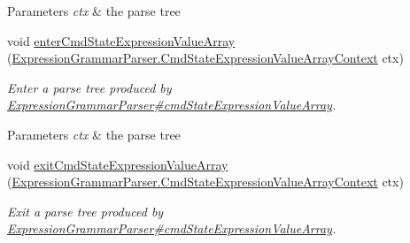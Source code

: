 \begin{DoxyCompactItemize}
\begin{DoxyCompactList}
\begin{DoxyParams}{Parameters}
{\em ctx} & the parse tree\\
\hline
\end{DoxyParams}
 \end{DoxyCompactList}\item 
void \hyperlink{classgov_1_1nasa_1_1jpf_1_1inspector_1_1server_1_1expression_1_1parser_1_1_expression_grammar_base_listener_a5a037779c228fa255993bf10a0fd145f}{enter\+Cmd\+State\+Expression\+Value\+Array} (\hyperlink{classgov_1_1nasa_1_1jpf_1_1inspector_1_1server_1_1expression_1_1parser_1_1_expression_grammar_pa4110664045d2bee8d9164488bf2614d4}{Expression\+Grammar\+Parser.\+Cmd\+State\+Expression\+Value\+Array\+Context} ctx)
\begin{DoxyCompactList}\small\item\em Enter a parse tree produced by \hyperlink{classgov_1_1nasa_1_1jpf_1_1inspector_1_1server_1_1expression_1_1parser_1_1_expression_grammar_parser_a5ca6781f2d54419c03ff89334158c305}{Expression\+Grammar\+Parser\#cmd\+State\+Expression\+Value\+Array}.


\begin{DoxyParams}{Parameters}
{\em ctx} & the parse tree\\
\hline
\end{DoxyParams}
 \end{DoxyCompactList}\item 
void \hyperlink{classgov_1_1nasa_1_1jpf_1_1inspector_1_1server_1_1expression_1_1parser_1_1_expression_grammar_base_listener_a63652a8e9d872b5eba6b72624b596ff7}{exit\+Cmd\+State\+Expression\+Value\+Array} (\hyperlink{classgov_1_1nasa_1_1jpf_1_1inspector_1_1server_1_1expression_1_1parser_1_1_expression_grammar_pa4110664045d2bee8d9164488bf2614d4}{Expression\+Grammar\+Parser.\+Cmd\+State\+Expression\+Value\+Array\+Context} ctx)
\begin{DoxyCompactList}\small\item\em Exit a parse tree produced by \hyperlink{classgov_1_1nasa_1_1jpf_1_1inspector_1_1server_1_1expression_1_1parser_1_1_expression_grammar_parser_a5ca6781f2d54419c03ff89334158c305}{Expression\+Grammar\+Parser\#cmd\+State\+Expression\+Value\+Array}.



\end{DoxyCompactList}
\end{DoxyCompactItemize}
